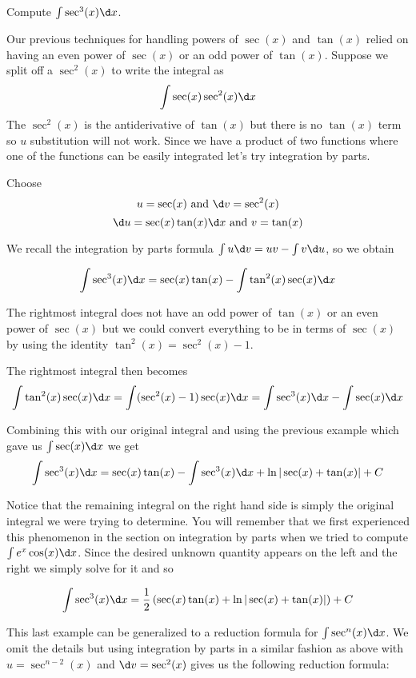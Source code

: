 \documentclass{ximera}
\begin{document}
\begin{example}
Compute $\int \sec^{3}(x) \d x $.

\begin{explanation}
Our previous techniques for handling powers of $\sec(x)$ and $\tan(x)$ relied on having an even power of $\sec(x)$ or an odd power of $\tan(x)$. 
Suppose we split off a $\sec^{2}(x)$ to write the integral as 
\[
 \int \sec(x) \sec^{2}(x) \d x
\]
The $\sec^{2}(x)$ is the antiderivative of $\tan(x)$ but there is no $\tan(x)$ term so $u$ substitution will not work. Since we have a product of two functions where one 
of the functions can be easily integrated let's try integration by parts. 

Choose
\[ 
u= \sec(x) \text{  and  } \d v=\sec^{2}(x) \\
\] 
\[
\d u=  \sec(x)\tan(x) \d x \text{  and  } v=\tan(x) 
\]

We recall the integration by parts formula $\int u \d v=uv-\int v \d u$, so we obtain

\[
\int \sec^{3}(x) \d x=\sec(x)\tan(x) - \int \tan^{2}(x)\sec(x)\d x
\]

The rightmost integral does not have an odd power of $\tan(x)$ or an even power of $\sec(x)$ but we could convert 
everything to be in terms of $\sec(x)$ by using the identity $\tan^{2}(x)=\sec^{2}(x)-1$. 

The rightmost integral then becomes
\[
\int \tan^{2}(x)\sec(x) \d x=\int (\sec^{2}(x)-1) \sec(x) \d x= \int \sec^{3}(x)\d x - \int \sec(x) \d x
\]

Combining this with our original integral and using the previous example which gave us $\int \sec(x) \d x$ we get
\[
\int \sec^3(x)  \d x=\sec(x) \tan(x)- \int \sec^3(x)  \d x + \ln| \sec(x)+\tan(x) | + C
\]

Notice that the remaining integral on the right hand side is simply the original integral we were trying to determine. You will remember that we first experienced this phenomenon in the section on integration by parts when we tried to compute $\int e^{x}\cos(x) \d x$. 
Since the desired unknown quantity appears on the left and the right we simply solve for it and so

\[
\int \sec^{3}(x) \d x=\frac{1}{2}\left(\sec(x) \tan(x) + \ln | \sec(x) + \tan(x)|  \right)  + C
\]
\end{explanation}
\end{example}

This last example can be generalized to a reduction formula for $\int \sec^{n}(x) \d x$. We omit the details but using integration by parts in a similar fashion
as above with $u=\sec^{n-2}(x)$ and $\d v=\sec^{2}(x)$ gives us the following reduction formula:
\end{document}
